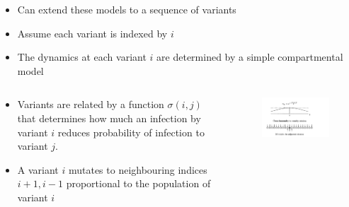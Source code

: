 \documentclass{beamer}
\begin{document}
\begin{frame}
    \begin{columns}
\begin{column}{\textwidth}
    \begin{itemize}
        \item Can extend these models to a sequence of variants
        \item Assume each variant is indexed by $i$ 
        \item The dynamics at each variant $i$ are determined by a simple compartmental model
    \end{itemize} 
\end{column}
\end{columns}



\end{frame}
\begin{frame}
    \begin{columns}
        \begin{column}{0.5\textwidth}
            \begin{itemize}
                \item Variants are related by a function $\sigma(i,j)$ that determines how much an infection by variant $i$ reduces probability of infection to variant $j$.
                \item A variant $i$ mutates to neighbouring indices $i+1, i-1$ proportional to the population of variant $i$
                \end{itemize}         
        \end{column}
        \begin{column}{0.6\textwidth}
            \begin{figure}
                \includegraphics[width=\textwidth]{gog_fig.png}
            \end{figure}
        \end{column}
    \end{columns}
    \centering
    \vfill
    \tiny{\cite{gogDynamicsSelectionManystrain2002}}
\end{frame}
\end{document}
